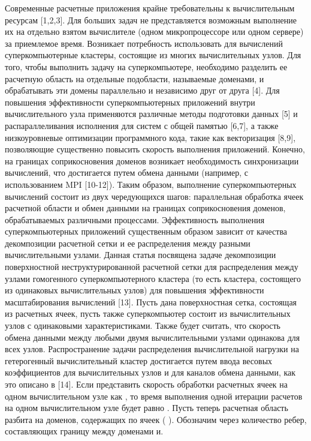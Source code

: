 \documentclass[
11pt,%
tightenlines,%
twoside,%
onecolumn,%
nofloats,%
nobibnotes,%
nofootinbib,%
superscriptaddress,%
noshowpacs,%
centertags]%
{revtex4}
\begin{document}
Современные расчетные приложения крайне требовательны к вычислительным ресурсам [1,2,3]. Для больших задач не представляется возможным выполнение их на отдельно взятом вычислителе (одном микропроцессоре или одном сервере) за приемлемое время. Возникает потребность использовать для вычислений суперкомпьютерные кластеры, состоящие из многих вычислительных узлов. Для того, чтобы выполнить задачу на суперкомпьютере, необходимо разделить ее расчетную область на отдельные подобласти, называемые доменами, и обрабатывать эти домены параллельно и независимо друг от друга [4]. Для повышения эффективности суперкомпьютерных приложений внутри вычислительного узла применяются различные методы подготовки данных [5] и распараллеливания исполнения для систем с общей памятью [6,7], а также низкоуровневые оптимизации программного кода, такие как векторизация [8,9], позволяющие существенно повысить скорость выполнения приложений. Конечно, на границах соприкосновения доменов возникает необходимость синхронизации вычислений, что достигается путем обмена данными (например, с использованием MPI [10-12]). Таким образом, выполнение суперкомпьютерных вычислений состоит из двух чередующихся шагов: параллельная обработка ячеек расчетной области и обмен данными на границах соприкосновения доменов, обрабатываемых различными процессами. Эффективность выполнения суперкомпьютерных приложений существенным образом зависит от качества декомпозиции расчетной сетки и ее распределения между разными вычислительными узлами.
Данная статья посвящена задаче декомпозиции поверхностной неструктурированной расчетной сетки для распределения между узлами гомогенного суперкомпьютерного кластера (то есть кластера, состоящего из одинаковых вычислительных узлов) для повышения эффективности масштабирования вычислений [13]. Пусть дана поверхностная сетка, состоящая из   расчетных ячеек, пусть также суперкомпьютер состоит из   вычислительных узлов с одинаковыми характеристиками. Также будет считать, что скорость обмена данными между любыми двумя вычислительными узлами одинакова для всех узлов. Распространение задачи распределения вычислительной нагрузки на гетерогенный вычислительный кластер достигается путем ввода весовых коэффициентов для вычислительных узлов и для каналов обмена данными, как это описано в [14]. Если представить скорость обработки расчетных ячеек на одном вычислительном узле как  , то время выполнения одной итерации расчетов на одном вычислительном узле будет равно  . Пусть теперь расчетная область разбита на   доменов, содержащих по   ячеек ( ). Обозначим через   количество ребер, составляющих границу между доменами   и.
\end{document}
